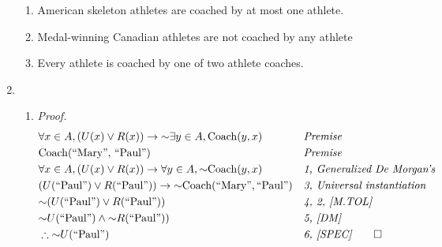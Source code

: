 \documentclass[11pt, notitlepage, leqno]{article}
\renewcommand{\neg}{\mathord{\sim}}
\begin{document}
\begin{enumerate}
\begin{enumerate}
\item American skeleton athletes are coached by at most one athlete.

\item Medal-winning Canadian athletes are not coached by any athlete

\item Every athlete is coached by one of two athlete coaches.

\end{enumerate}

\item \begin{enumerate}

\item \textit{Proof.} \nopagebreak \vspace{-10pt} 
\begin{align}
	& \forall x \in A, (U(x) \vee R(x)) \to \neg \exists y \in A, \textrm{\textrm{Coach}}(y, x) && \textit{Premise} \\
	& \textrm{\textrm{Coach}}(\textrm{``Mary'', ``Paul''}) && \textit{Premise} \\
	& \forall x \in A, (U(x) \vee R(x)) \to \forall y \in A, \neg \textrm{\textrm{Coach}}(y, x) && \textit{1, Generalized De Morgan's}\\
	& (U(\textrm{``Paul''}) \vee R(\textrm{``Paul''})) \to \neg \textrm{\textrm{Coach}}(\textrm{``Mary''}, \textrm{``Paul''}) && \textit{3, Universal instantiation}\\
	& \neg  (U(\textrm{``Paul''}) \vee R(\textrm{``Paul''})) && \textit{4, 2, [M.TOL]} \\
	& \neg U(\textrm{``Paul''}) \wedge \neg R(\textrm{``Paul''})) && \textit{5, [DM]} \\
	& \therefore \neg U(\textrm{``Paul''}) && \textit{6, [SPEC]} \notag \qed
\end {align}


\end{enumerate}
\end{enumerate}
\end{document}
